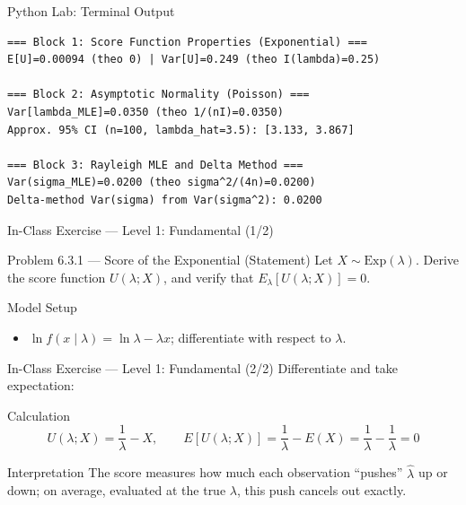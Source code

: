 \documentclass[aspectratio=169,xcolor={dvipsnames,table}]{beamer}
\begin{document}
\begin{frame}[fragile]{Python Lab: Terminal Output}
	\vspace{-0.1cm}
	\begin{block}{}
		\fontsize{4pt}{5pt}\selectfont
		\begin{verbatim}
=== Block 1: Score Function Properties (Exponential) ===
E[U]=0.00094 (theo 0) | Var[U]=0.249 (theo I(lambda)=0.25)

=== Block 2: Asymptotic Normality (Poisson) ===
Var[lambda_MLE]=0.0350 (theo 1/(nI)=0.0350)
Approx. 95% CI (n=100, lambda_hat=3.5): [3.133, 3.867]

=== Block 3: Rayleigh MLE and Delta Method ===
Var(sigma_MLE)=0.0200 (theo sigma^2/(4n)=0.0200)
Delta-method Var(sigma) from Var(sigma^2): 0.0200
		\end{verbatim}
	\end{block}
\end{frame}

\begin{frame}{In-Class Exercise --- Level 1: Fundamental (1/2)}
	\vspace{-0.1cm}
	\begin{block}{Problem 6.3.1 --- Score of the Exponential (Statement)}
		Let $X\sim\text{Exp}(\lambda)$. Derive the score function $U(\lambda;X)$, and verify that $E_\lambda[U(\lambda;X)]=0$.
	\end{block}
	\vspace{0.15cm}
	\pause
	\begin{alertblock}{Model Setup}
		\begin{itemize}\itemsep=0.04cm
			\item $\ln f(x\mid\lambda) = \ln\lambda - \lambda x$; differentiate with respect to $\lambda$.
		\end{itemize}
	\end{alertblock}
\end{frame}

\begin{frame}{In-Class Exercise --- Level 1: Fundamental (2/2)}
	\vspace{-0.05cm}
	\scriptsize
	Differentiate and take expectation: \pause
	\begin{block}{Calculation}
		$$U(\lambda;X) = \frac{1}{\lambda}-X, \qquad E[U(\lambda;X)] = \frac{1}{\lambda}-E(X) = \frac{1}{\lambda}-\frac{1}{\lambda} = 0$$
	\end{block}
	\vspace{0.05cm}
	\pause
	\begin{alertblock}{Interpretation}
		\scriptsize
		The score measures how much each observation ``pushes'' $\hat\lambda$ up or down; on average, evaluated at the true $\lambda$, this push cancels out exactly.
	\end{alertblock}
\end{frame}
\end{document}
